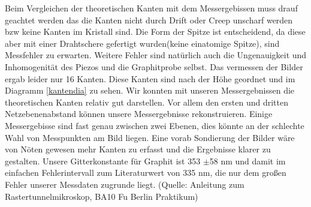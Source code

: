 \documentclass[10pt,a4paper]{article}
\begin{document}
Beim Vergleichen der theoretischen Kanten mit dem Messergebissen muss drauf geachtet werden das die Kanten nicht durch Drift oder Creep unscharf werden bzw keine Kanten im Kristall sind. Die Form der Spitze ist entscheidend, da diese aber mit einer Drahtschere gefertigt wurden(keine einatomige Spitze), sind Messfehler zu erwarten. Weitere Fehler sind natürlich auch die Ungenauigkeit und Inhomogenität des Piezos und die Graphitprobe selbst.
Das vermessen der Bilder ergab leider nur 16 Kanten. Diese Kanten sind nach der Höhe geordnet und im Diagramm \ref{kantendia} zu sehen. Wir konnten mit unseren Messergebnissen die theoretischen Kanten relativ gut darstellen. Vor allem den ersten und dritten Netzebenenabstand können unsere Messergebnisse rekonstruieren. Einige Messergebisse sind fast genau zwischen zwei Ebenen, dies könnte an der schlechte Wahl von Messpunkten am Bild liegen. Eine vorab Sondierung der Bilder wäre von Nöten gewesen mehr Kanten zu erfasst und die Ergebnisse klarer zu gestalten.
Unsere Gitterkonstante für Graphit ist 353 $\pm$58 nm und damit im einfachen Fehlerintervall zum Literaturwert von 335 nm, die nur dem großen Fehler unserer Messdaten zugrunde liegt. (Quelle: Anleitung zum Rastertunnelmikroskop, BA10 Fu Berlin Praktikum)
\end{document}

